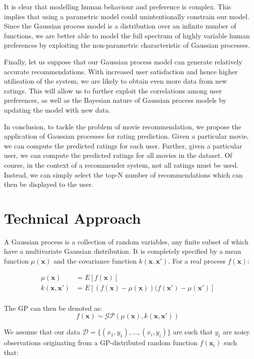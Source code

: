 \documentclass[letterpaper]{article}
\begin{document}
It is clear that modelling human behaviour and preference is complex. This implies that using a parametric model could unintentionally constrain our model. Since the Gaussian process model is a distribution over an infinite number of functions, we are better able to model the full spectrum of highly variable human preferences by exploiting the non-parametric characteristic of Gaussian processes.

Finally, let us suppose that our Gaussian process model can generate relatively accurate recommendations. With increased user satisfaction and hence higher utilisation of the system, we are likely to obtain even more data from new ratings. This will allow us to further exploit the correlations among user preferences, as well as the Bayesian nature of Gaussian process models by updating the model with new data.

In conclusion, to tackle the problem of movie recommendation, we propose the application of Gaussian processes for rating prediction.
Given a particular movie, we can compute the predicted ratings for each user.
Further, given a particular user, we can compute the predicted ratings for all movies in the dataset.
Of course, in the context of a recommender system, not all ratings must be used. 
Instead, we can simply select the top-N number of recommendations which can then be displayed to the user.

\section{Technical Approach}
A Gaussian process is a collection of random variables, any finite subset of which have a multivariate Gaussian distribution. It is completely specified by a mean function $\mu(\textbf{x})$ and the covariance function $k(\textbf{x}, \textbf{x}')$. For a real process $f(\textbf{x})$:

\begin{align*}
	\mu(\textbf{x}) &= E[f(\textbf{x})] \\
	k(\textbf{x}, \textbf{x}') &= E[(f(\textbf{x}) - \mu(\textbf{x}))(f(\textbf{x}') - \mu(\textbf{x}')] \\
\end{align*}

The GP can then be denoted as:
\[f(\textbf{x}) \sim \mathcal{GP}(\mu(\textbf{x}), k(\textbf{x}, \textbf{x}'))\]

We assume that our data $\mathcal{D} = \{(x_1, y_1), \ldots, (x_i, y_i)\}$ are such that $y_i$ are noisy observations originating from a GP-distributed random function $f(\textbf{x}_i)$ such that:
\end{document}
